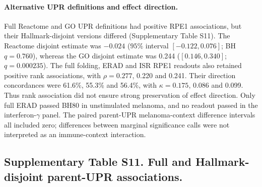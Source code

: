 \documentclass[a4paper,fleqn]{cas-sc}
\makeatletter
\DeclareRobustCommand{\rev}[1]{{\color{red}\def\@citecolor{black}\def\@linkcolor{red}\def\@urlcolor{red}#1}}
\makeatother
\begin{document}
\paragraph{\rev{Alternative UPR definitions and effect direction.}}
\rev{Full Reactome and GO UPR definitions had positive RPE1 associations, but their Hallmark-disjoint versions differed (Supplementary Table S11).} \rev{The Reactome disjoint estimate was $-0.024$ ($95\%$ interval $[-0.122,0.076]$; BH $q=0.760$), whereas the GO disjoint estimate was 0.244 ($[0.146,0.340]$; $q=0.000235$).} \rev{The full folding, ERAD and ISR RPE1 readouts also retained positive rank associations, with $\rho=0.277$, 0.220 and 0.241.} \rev{Their direction concordances were 61.6\%, 55.3\% and 56.4\%, with $\kappa=0.175$, 0.086 and 0.099.} \rev{Thus rank association did not ensure strong preservation of effect direction.} \rev{Only full ERAD passed BH80 in unstimulated melanoma, and no readout passed in the interferon-$\gamma$ panel.} \rev{The paired parent-UPR melanoma-context difference intervals all included zero; differences between marginal significance calls were not interpreted as an immune-context interaction.}

\subsection*{\rev{Supplementary Table S11. Full and Hallmark-disjoint parent-UPR associations.}}
\end{document}
